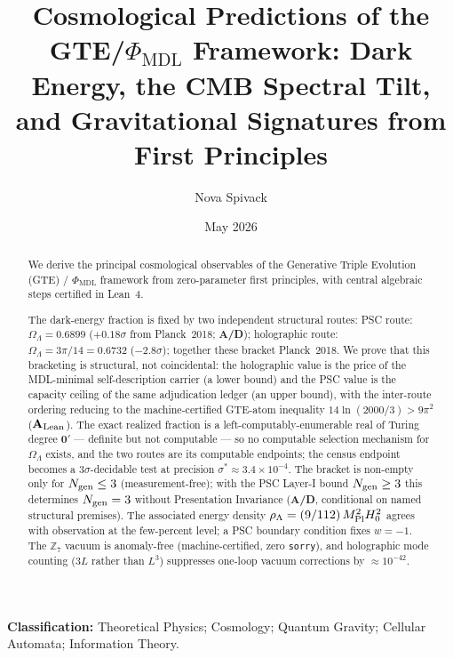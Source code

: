 \documentclass[11pt]{article}
\theoremstyle{remark}
\newcommand{\PHIMDL}{\Phi_{\mathrm{MDL}}}
\newcommand{\ZS}{\mathbb{Z}_7}
\newcommand{\MPl}{M_{\rm Pl}}
\newcommand{\OmL}{\Omega_\Lambda}
\newcommand{\CatAL}{\ensuremath{\textbf{A}_{\rm Lean}}}
\newcommand{\CatAD}{\textbf{A/D}}
\begin{document}
\title{\textbf{Cosmological Predictions of the GTE/$\Phi_{\mathrm{MDL}}$
Framework: Dark Energy, the CMB Spectral Tilt, and Gravitational
Signatures from First Principles}}

\author{Nova Spivack}
\date{May 2026}
\maketitle

\NovaZenodoAfterTitle

\noindent\textbf{Classification:} Theoretical Physics; Cosmology; Quantum
Gravity; Cellular Automata; Information Theory.

\begin{abstract}
We derive the principal cosmological observables of the Generative Triple
Evolution (GTE) / $\PHIMDL$ framework from zero-parameter first principles,
with central algebraic steps certified in Lean~4.

The dark-energy fraction is fixed by two independent structural routes:
PSC route: $\OmL = 0.6899$ ($+0.18\sigma$ from Planck~2018; \CatAD);
holographic route: $\OmL = 3\pi/14 = 0.6732$ ($-2.8\sigma$);
together these bracket Planck~2018.
We prove that this bracketing is structural, not coincidental: the holographic
value is the price of the MDL-minimal self-description carrier (a lower bound)
and the PSC value is the capacity ceiling of the same adjudication ledger (an
upper bound), with the inter-route ordering reducing to the machine-certified
GTE-atom inequality $14\ln(2000/3) > 9\pi^2$ (\CatAL). The exact realized
fraction is a left-computably-enumerable real of Turing degree $\mathbf{0}'$
--- definite but not computable --- so no computable selection mechanism for
$\OmL$ exists, and the two routes are its computable endpoints; the census
endpoint becomes a $3\sigma$-decidable test at precision
$\sigma^* \approx 3.4\times10^{-4}$.
The bracket is non-empty only for $N_{\rm gen} \le 3$ (measurement-free); with
the PSC Layer-I bound $N_{\rm gen} \ge 3$ this determines $N_{\rm gen} = 3$
without Presentation Invariance (\CatAD, conditional on named structural
premises).
The associated energy density $\rho_\Lambda = (9/112)\,\MPl^2 H_0^2$ agrees with
observation at the few-percent level; a PSC boundary condition fixes $w = -1$.
The $\ZS$ vacuum is anomaly-free (machine-certified, zero \texttt{sorry}),
and holographic mode counting ($3L$ rather than $L^3$) suppresses
one-loop vacuum corrections by $\approx 10^{-42}$.


\end{abstract}
\end{document}
